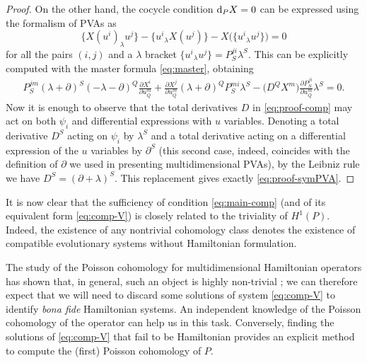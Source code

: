 \documentclass[10pt,a4paper]{amsart}
\numberwithin{equation}{section}
\begin{document}
\begin{proof}
On the other hand, the cocycle condition ${\rm d}_PX=0$ can be expressed using the formalism of PVAs \cite{casati2015deformations} as
\[%
\big\{X(u^i)_\lambda u^j\big\}-\big\{u^i{}_\lambda X(u^j)\big\}-X\big(\big\{u^i{}_\lambda u^j\big\}\big)=0
\]
for all the pairs $(i,j)$ and a $\lambda$ bracket $\{u^i{}_{\lambda}u^j\}=P^{ji}_S\lambda^S$. This can be explicitly computed with the master formula \eqref{eq:master}, obtaining
\begin{gather}\label{eq:proof-symPVA}
P^{jm}_S(\lambda+\partial)^S(-\lambda-\partial)^Q\frac{\partial X^i}{\partial u^m_Q}+\frac{\partial X^j}{\partial u^m_Q}(\lambda+\partial)^Q P^{mi}_S\lambda^S-\big(D^Q X^m\big)\frac{\partial P^{ji}_S}{\partial u^m_Q}\lambda^S=0.
\end{gather}
Now it is enough to observe that the total derivatives $D$ in \eqref{eq:proof-comp} may act on both $\psi_i$ and differential expressions with $u$ variables. Denoting a total derivative $D^S$ acting on $\psi_i$ by $\lambda^S$ and a total derivative acting on a differential expression of the $u$ variables by $\partial^S$ (this second case, indeed, coincides with the definition of $\partial$ we used in presenting multidimensional PVAs), by the Leibniz rule we have $D^S=(\partial+\lambda)^S$. This replacement gives exactly \eqref{eq:proof-symPVA}.
\end{proof}

It is now clear that the sufficiency of condition \eqref{eq:main-comp} (and of its equivalent form \eqref{eq:comp-V}) is closely related to the triviality of $H^1(P)$. Indeed, the existence of any nontrivial cohomology class denotes the existence of compatible evolutionary systems without Hamiltonian formulation.

The study of the Poisson cohomology for multidimensional Hamiltonian operators has shown that, in general, such an object is highly non-trivial \cite{ccs17,ccs18,casati2015deformations}; we can therefore expect that we will need to discard some solutions of system \eqref{eq:comp-V} to identify \emph{bona fide} Hamiltonian systems. An independent knowledge of the Poisson cohomology of the operator can help us in this task. Conversely, finding the solutions of \eqref{eq:comp-V} that fail to be Hamiltonian provides an explicit method to compute the (first) Poisson cohomology of $P$.
\end{document}
